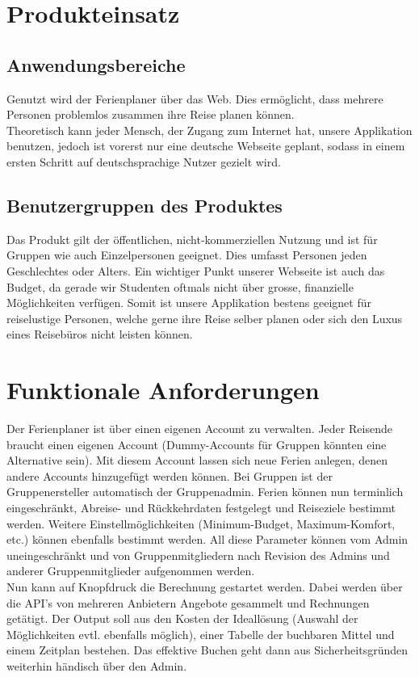 \documentclass[10pt,a4paper,titlepage,twoside,german,final]{zhawreprt}
\numberwithin{table}{chapter}
\begin{document}
\chapter{Produkteinsatz}\label{chp:ProductApplication}
\section{Anwendungsbereiche}\label{sec:FieldOfApplience}
Genutzt wird der Ferienplaner über das Web. Dies ermöglicht, dass mehrere Personen problemlos zusammen ihre Reise planen können.\\
Theoretisch kann jeder Mensch, der Zugang zum Internet hat, unsere Applikation benutzen, jedoch ist vorerst nur eine deutsche Webseite geplant, sodass in einem ersten Schritt auf deutschsprachige Nutzer gezielt wird.
\section{Benutzergruppen des Produktes}\label{sec:TargetAudience}
Das Produkt gilt der öffentlichen, nicht-kommerziellen Nutzung und ist für Gruppen wie auch Einzelpersonen geeignet. Dies umfasst Personen jeden Geschlechtes oder Alters. Ein wichtiger Punkt unserer Webseite ist auch das Budget, da gerade wir Studenten oftmals nicht über grosse, finanzielle Möglichkeiten verfügen. Somit ist unsere Applikation bestens geeignet für reiselustige Personen, welche gerne ihre Reise selber planen oder sich den Luxus eines Reisebüros nicht leisten können.

\chapter{Funktionale Anforderungen}\label{chp:FunctionalRequirements}
Der Ferienplaner ist über einen eigenen Account zu verwalten. Jeder Reisende braucht einen eigenen Account (Dummy-Accounts für Gruppen könnten eine Alternative sein). Mit diesem Account lassen sich neue Ferien anlegen, denen andere Accounts hinzugefügt werden können. Bei Gruppen ist der Gruppenersteller automatisch der Gruppenadmin. Ferien können nun terminlich eingeschränkt, Abreise- und Rückkehrdaten festgelegt und Reiseziele bestimmt werden. Weitere Einstellmöglichkeiten (Minimum-Budget, Maximum-Komfort, etc.) können ebenfalls bestimmt werden. All diese Parameter können vom Admin uneingeschränkt und von Gruppenmitgliedern nach Revision des Admins und anderer Gruppenmitglieder aufgenommen werden.\\
Nun kann auf Knopfdruck die Berechnung gestartet werden. Dabei werden über die API's von mehreren Anbietern Angebote gesammelt und Rechnungen getätigt. Der Output soll aus den Kosten der Ideallösung (Auswahl der Möglichkeiten evtl. ebenfalls möglich), einer Tabelle der buchbaren Mittel und einem Zeitplan bestehen. Das effektive Buchen geht dann aus Sicherheitsgründen weiterhin händisch über den Admin.
\end{document}
